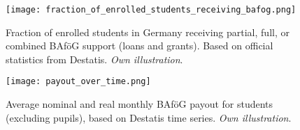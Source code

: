 \begin{figure}[H]
  \centering
  \begin{minipage}[t]{0.42\textwidth}
    \centering
    \texttt{[image: fraction\_of\_enrolled\_students\_receiving\_bafog.png]}
    \caption{
      Fraction of enrolled students in Germany receiving partial, full, or combined BAföG support (loans and grants). Based on official statistics from Destatis. \textit{Own illustration}.
    }
    \label{figure:bafoeg_support}
  \end{minipage}%
  \hfill
  \begin{minipage}[t]{0.42\textwidth}
    \centering
    \texttt{[image: payout\_over\_time.png]}
    \caption{
      Average nominal and real monthly BAföG payout for students (excluding pupils), based on Destatis time series. \textit{Own illustration}.
    }
    \label{figure:payout_over_time}
  \end{minipage}

\end{figure}
